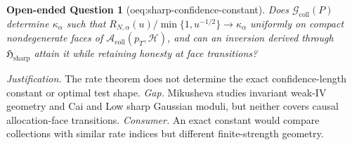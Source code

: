 \documentclass{article}
\newtheorem{openendedquestion}{Open-ended Question}
\begin{document}
\begin{openendedquestion}[oeq:sharp-confidence-constant]\label{oeq:sharp-confidence-constant}
Does \(\mathcal G_{\mathrm{coll}}(P)\) determine \(\kappa_\alpha\) such that \(R_{N,\alpha}(u)/\min\{1,u^{-1/2}\}\to\kappa_\alpha\) uniformly on compact nondegenerate faces of \(\mathcal A_{\mathrm{coll}}(p_T,\mathcal H)\), and can an inversion derived through \(\mathfrak H_{\mathrm{sharp}}\) attain it while retaining honesty at face transitions?
\end{openendedquestion}
\par\smallskip\noindent \textit{Justification.} The rate theorem does not determine the exact confidence-length constant or optimal test shape. \textit{Gap.} Mikusheva studies invariant weak-IV geometry and Cai and Low sharp Gaussian moduli, but neither covers causal allocation-face transitions. \textit{Consumer.} An exact constant would compare collections with similar rate indices but different finite-strength geometry.
\end{document}
